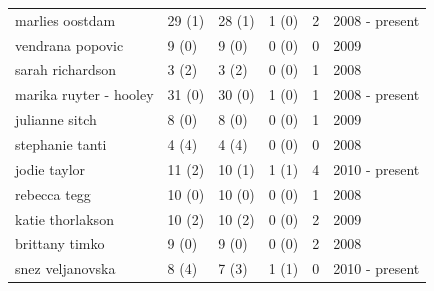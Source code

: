 \documentclass{article}
\begin{document}
\begin{tabular}{llllll}
marlies oostdam & 29 (1) & 28 (1) & 1 (0) & 2 & 2008 - present \\
vendrana popovic & 9 (0) & 9 (0) & 0 (0) & 0 & 2009 \\
sarah richardson & 3 (2) & 3 (2) & 0 (0) & 1 & 2008 \\
marika ruyter - hooley & 31 (0) & 30 (0) & 1 (0) & 1 & 2008 - present \\
julianne sitch & 8 (0) & 8 (0) & 0 (0) & 1 & 2009 \\
stephanie tanti & 4 (4) & 4 (4) & 0 (0) & 0 & 2008 \\
jodie taylor & 11 (2) & 10 (1) & 1 (1) & 4 & 2010 - present \\
rebecca tegg & 10 (0) & 10 (0) & 0 (0) & 1 & 2008 \\
katie thorlakson & 10 (2) & 10 (2) & 0 (0) & 2 & 2009 \\
brittany timko & 9 (0) & 9 (0) & 0 (0) & 2 & 2008 \\
snez veljanovska & 8 (4) & 7 (3) & 1 (1) & 0 & 2010 - present \\
\bottomrule
\end{tabular}
\end{document}
